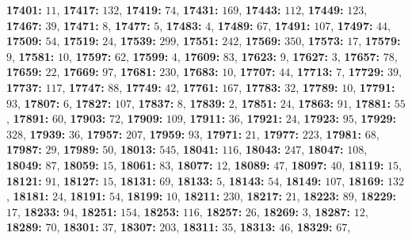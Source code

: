 \textsf{\bfseries 17401:} $11$, \textsf{\bfseries 17417:} $132$, \textsf{\bfseries 17419:} $74$, \textsf{\bfseries 17431:} $169$, \textsf{\bfseries 17443:} $112$, \textsf{\bfseries 17449:} $123$, \textsf{\bfseries 17467:} $39$, \textsf{\bfseries 17471:} $8$, \textsf{\bfseries 17477:} $5$, \textsf{\bfseries 17483:} $4$, \textsf{\bfseries 17489:} $67$, \textsf{\bfseries 17491:} $107$, \textsf{\bfseries 17497:} $44$, \textsf{\bfseries 17509:} $54$, \textsf{\bfseries 17519:} $24$, \textsf{\bfseries 17539:} $299$, \textsf{\bfseries 17551:} $242$, \textsf{\bfseries 17569:} $350$, \textsf{\bfseries 17573:} $17$, \textsf{\bfseries 17579:} $9$, \textsf{\bfseries 17581:} $10$, \textsf{\bfseries 17597:} $62$, \textsf{\bfseries 17599:} $4$, \textsf{\bfseries 17609:} $83$, \textsf{\bfseries 17623:} $9$, \textsf{\bfseries 17627:} $3$, \textsf{\bfseries 17657:} $78$, \textsf{\bfseries 17659:} $22$, \textsf{\bfseries 17669:} $97$, \textsf{\bfseries 17681:} $230$, \textsf{\bfseries 17683:} $10$, \textsf{\bfseries 17707:} $44$, \textsf{\bfseries 17713:} $7$, \textsf{\bfseries 17729:} $39$, \textsf{\bfseries 17737:} $117$, \textsf{\bfseries 17747:} $88$, \textsf{\bfseries 17749:} $42$, \textsf{\bfseries 17761:} $167$, \textsf{\bfseries 17783:} $32$, \textsf{\bfseries 17789:} $10$, \textsf{\bfseries 17791:} $93$, \textsf{\bfseries 17807:} $6$, \textsf{\bfseries 17827:} $107$, \textsf{\bfseries 17837:} $8$, \textsf{\bfseries 17839:} $2$, \textsf{\bfseries 17851:} $24$, \textsf{\bfseries 17863:} $91$, \textsf{\bfseries 17881:} $55$, \textsf{\bfseries 17891:} $60$, \textsf{\bfseries 17903:} $72$, \textsf{\bfseries 17909:} $109$, \textsf{\bfseries 17911:} $36$, \textsf{\bfseries 17921:} $24$, \textsf{\bfseries 17923:} $95$, \textsf{\bfseries 17929:} $328$, \textsf{\bfseries 17939:} $36$, \textsf{\bfseries 17957:} $207$, \textsf{\bfseries 17959:} $93$, \textsf{\bfseries 17971:} $21$, \textsf{\bfseries 17977:} $223$, \textsf{\bfseries 17981:} $68$, \textsf{\bfseries 17987:} $29$, \textsf{\bfseries 17989:} $50$, \textsf{\bfseries 18013:} $545$, \textsf{\bfseries 18041:} $116$, \textsf{\bfseries 18043:} $247$, \textsf{\bfseries 18047:} $108$, \textsf{\bfseries 18049:} $87$, \textsf{\bfseries 18059:} $15$, \textsf{\bfseries 18061:} $83$, \textsf{\bfseries 18077:} $12$, \textsf{\bfseries 18089:} $47$, \textsf{\bfseries 18097:} $40$, \textsf{\bfseries 18119:} $15$, \textsf{\bfseries 18121:} $91$, \textsf{\bfseries 18127:} $15$, \textsf{\bfseries 18131:} $69$, \textsf{\bfseries 18133:} $5$, \textsf{\bfseries 18143:} $54$, \textsf{\bfseries 18149:} $107$, \textsf{\bfseries 18169:} $132$, \textsf{\bfseries 18181:} $24$, \textsf{\bfseries 18191:} $54$, \textsf{\bfseries 18199:} $10$, \textsf{\bfseries 18211:} $230$, \textsf{\bfseries 18217:} $21$, \textsf{\bfseries 18223:} $89$, \textsf{\bfseries 18229:} $17$, \textsf{\bfseries 18233:} $94$, \textsf{\bfseries 18251:} $154$, \textsf{\bfseries 18253:} $116$, \textsf{\bfseries 18257:} $26$, \textsf{\bfseries 18269:} $3$, \textsf{\bfseries 18287:} $12$, \textsf{\bfseries 18289:} $70$, \textsf{\bfseries 18301:} $37$, \textsf{\bfseries 18307:} $203$, \textsf{\bfseries 18311:} $35$, \textsf{\bfseries 18313:} $46$, \textsf{\bfseries 18329:} $67$, 
